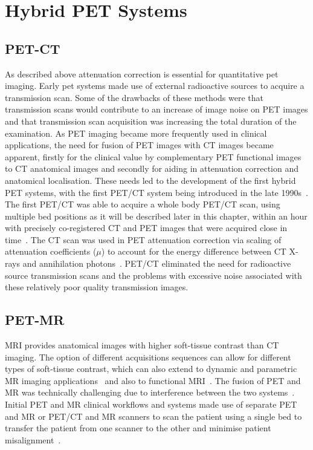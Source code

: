 \section{Hybrid PET Systems}
\subsection{PET-CT}
As described above attenuation correction is essential for quantitative \gls{pet} imaging. Early \gls{pet} systems made use of external radioactive sources to acquire a transmission scan. Some of the drawbacks of these methods were that transmission scans would contribute to an increase of image noise on PET images and that transmission scan acquisition was increasing the total duration of the examination.
As PET imaging became more frequently used in clinical applications, the need for fusion of PET images with CT images became apparent, firstly for the clinical value by complementary PET functional images to CT anatomical images and secondly for aiding in attenuation correction and anatomical localisation. These needs led to the development of the first hybrid PET systems, with the first PET/CT system being introduced in the late 1990s~\cite{Townsend2008}.
The first PET/CT was able to acquire a whole body PET/CT scan, using multiple bed positions as it will be described later in this chapter, within an hour with precisely co-registered CT and PET images that were acquired close in time~\cite{Beyer2000}. The CT scan was used in PET attenuation correction via scaling of attenuation coefficients ($\mu$) to account for the energy difference between CT X-rays and annihilation photons~\cite{Kinahan1998}. PET/CT eliminated the need for radioactive source transmission scans and the problems with excessive noise associated with these relatively poor quality transmission images.

\subsection{PET-MR}
\label{sec:PET_MR_Systems}
MRI provides anatomical images with higher soft-tissue contrast than CT imaging. The option of different acquisitions sequences can allow for different types of soft-tissue contrast, which can also extend to dynamic and parametric MR imaging applications~\cite{Besson2020} and also to functional MRI~\cite{Kolb2012}.
The fusion of PET and MR was technically challenging due to interference between the two systems~\cite{Disselhorst2014}.
Initial PET and MR clinical workflows and systems made use of separate PET and MR or PET/CT and MR scanners to scan the patient using a single bed to transfer the patient from one scanner to the other and minimise patient misalignment~\cite{Zaidi2011,Veit-Haibach2013}.

